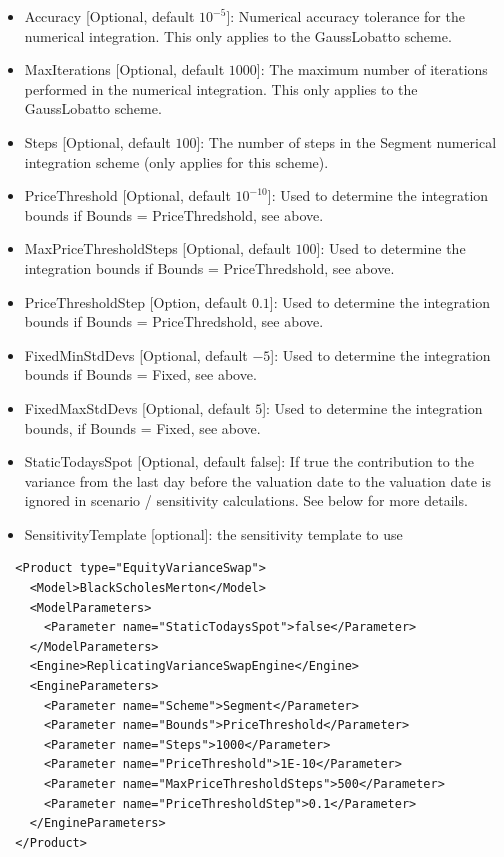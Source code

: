 \begin{itemize}
\item Accuracy [Optional, default $10^{-5}$]: Numerical accuracy tolerance for the numerical integration. This only
  applies to the GaussLobatto scheme.
\item MaxIterations [Optional, default $1000$]: The maximum number of iterations performed in the numerical
  integration. This only applies to the GaussLobatto scheme.
\item Steps [Optional, default $100$]: The number of steps in the Segment numerical integration scheme (only applies for
  this scheme).
\item PriceThreshold [Optional, default $10^{-10}$]: Used to determine the integration bounds if Bounds = PriceThredshold, see above.
\item MaxPriceThresholdSteps [Optional, default $100$]: Used to determine the integration bounds if Bounds = PriceThredshold, see above.
\item PriceThresholdStep [Option, default $0.1$]: Used to determine the integration bounds if Bounds = PriceThredshold, see above.
\item FixedMinStdDevs [Optional, default $-5$]: Used to determine the integration bounds if Bounds = Fixed, see above.
\item FixedMaxStdDevs [Optional, default $5$]: Used to determine the integration bounds, if Bounds = Fixed, see above.
\item StaticTodaysSpot [Optional, default false]: If true the contribution to the variance from the last day before the
  valuation date to the valuation date is ignored in scenario / sensitivity calculations. See below for more details.
\item SensitivityTemplate [optional]: the sensitivity template to use
\end{itemize}

\begin{listing}[ht]
\begin{verbatim}
  <Product type="EquityVarianceSwap">
    <Model>BlackScholesMerton</Model>
    <ModelParameters>
      <Parameter name="StaticTodaysSpot">false</Parameter>
    </ModelParameters>
    <Engine>ReplicatingVarianceSwapEngine</Engine>
    <EngineParameters>
      <Parameter name="Scheme">Segment</Parameter>
      <Parameter name="Bounds">PriceThreshold</Parameter>
      <Parameter name="Steps">1000</Parameter>
      <Parameter name="PriceThreshold">1E-10</Parameter>
      <Parameter name="MaxPriceThresholdSteps">500</Parameter>
      <Parameter name="PriceThresholdStep">0.1</Parameter>
    </EngineParameters>
  </Product>
\end{verbatim}
\caption{Configuration for Product EquityVarianceSwap, Model BlackScholesMerton, Engine ReplicatingVarianceSwapEngine,
  ``Robust'' configuration using PriceThreshold if market smiles are of lower quality.}
\label{lst:peconfig_EquityVarianceSwap_BlackScholesMerton_ReplicatingVarianceSwapEngine_1}
\end{listing}

